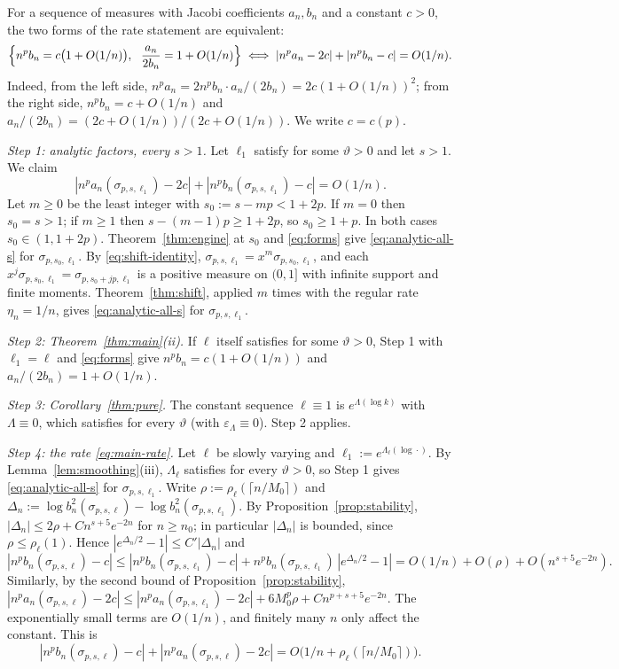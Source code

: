 For a sequence of measures with Jacobi coefficients $a_n,b_n$ and a constant $c>0$, the two forms of the rate
statement are equivalent:
\begin{equation}\label{eq:forms}
  \Bigl\{n^pb_n=c\bigl(1+O(1/n)\bigr),\ \ \frac{a_n}{2b_n}=1+O(1/n)\Bigr\}
  \iff |n^pa_n-2c|+|n^pb_n-c|=O(1/n).
\end{equation}
Indeed, from the left side, $n^pa_n=2n^pb_n\cdot a_n/(2b_n)=2c(1+O(1/n))^2$; from the right side,
$n^pb_n=c+O(1/n)$ and $a_n/(2b_n)=(2c+O(1/n))/(2c+O(1/n))$. We write $c=c(p)$.

\emph{Step 1: analytic factors, every $s>1$.} Let $\ell_1$ satisfy \Ath{\vartheta} for some $\vartheta>0$ and let $s>1$. We claim
\begin{equation}\label{eq:analytic-all-s}
  |n^pa_n(\sigma_{p,s,\ell_1})-2c|+|n^pb_n(\sigma_{p,s,\ell_1})-c|=O(1/n).
\end{equation}
Let $m\ge0$ be the least integer with $s_0:=s-mp<1+2p$. If $m=0$ then $s_0=s>1$; if $m\ge1$ then $s-(m-1)p\ge1+2p$, so
$s_0\ge1+p$. In both cases $s_0\in(1,1+2p)$. Theorem~\ref{thm:engine} at $s_0$ and \eqref{eq:forms} give
\eqref{eq:analytic-all-s} for $\sigma_{p,s_0,\ell_1}$. By \eqref{eq:shift-identity},
$\sigma_{p,s,\ell_1}=x^m\sigma_{p,s_0,\ell_1}$, and each $x^j\sigma_{p,s_0,\ell_1}=\sigma_{p,s_0+jp,\ell_1}$ is a positive
measure on $(0,1]$ with infinite support and finite moments. Theorem~\ref{thm:shift}, applied $m$ times with the regular
rate $\eta_n=1/n$, gives \eqref{eq:analytic-all-s} for $\sigma_{p,s,\ell_1}$.

\emph{Step 2: Theorem~\ref{thm:main}(ii).} If $\ell$ itself satisfies \Ath{\vartheta} for some $\vartheta>0$, Step 1 with $\ell_1=\ell$ and
\eqref{eq:forms} give $n^pb_n=c(1+O(1/n))$ and $a_n/(2b_n)=1+O(1/n)$.

\emph{Step 3: Corollary~\ref{thm:pure}.} The constant sequence $\ell\equiv1$ is $e^{\Lambda(\log k)}$ with $\Lambda\equiv0$,
which satisfies \Ath{\vartheta} for every $\vartheta$ (with $\varepsilon_\Lambda\equiv0$). Step 2 applies.

\emph{Step 4: the rate \eqref{eq:main-rate}.} Let $\ell$ be slowly varying and $\ell_1:=e^{\Lambda_\ell(\log\cdot)}$. By
Lemma~\ref{lem:smoothing}(iii), $\Lambda_\ell$ satisfies \Ath{\vartheta} for every $\vartheta>0$, so Step 1 gives
\eqref{eq:analytic-all-s} for $\sigma_{p,s,\ell_1}$. Write $\rho:=\rho_\ell(\lceil n/M_0\rceil)$ and
$\Delta_n:=\log b_n^2(\sigma_{p,s,\ell})-\log b_n^2(\sigma_{p,s,\ell_1})$. By Proposition~\ref{prop:stability},
$|\Delta_n|\le2\rho+Cn^{s+5}e^{-2n}$ for $n\ge n_0$; in particular $|\Delta_n|$ is bounded, since $\rho\le\rho_\ell(1)$.
Hence $|e^{\Delta_n/2}-1|\le C'|\Delta_n|$ and
\[
  |n^pb_n(\sigma_{p,s,\ell})-c|\le|n^pb_n(\sigma_{p,s,\ell_1})-c|+n^pb_n(\sigma_{p,s,\ell_1})\,|e^{\Delta_n/2}-1|
  =O(1/n)+O(\rho)+O(n^{s+5}e^{-2n}).
\]
Similarly, by the second bound of Proposition~\ref{prop:stability},
$|n^pa_n(\sigma_{p,s,\ell})-2c|\le|n^pa_n(\sigma_{p,s,\ell_1})-2c|+6M_0^p\rho+Cn^{p+s+5}e^{-2n}$. The exponentially small
terms are $O(1/n)$, and finitely many $n$ only affect the constant. This is
\[
  |n^pb_n(\sigma_{p,s,\ell})-c|+|n^pa_n(\sigma_{p,s,\ell})-2c|=O\bigl(1/n+\rho_\ell(\lceil n/M_0\rceil)\bigr).
\]

